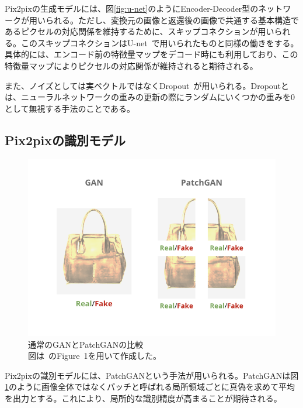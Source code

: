 Pix2pixの生成モデルには、図\ref{fig:u-net}のようにEncoder-Decoder型のネットワークが用いられる。ただし、変換元の画像と返還後の画像で共通する基本構造であるピクセルの対応関係を維持するために、スキップコネクションが用いられる。このスキップコネクションはU-net~\cite{u-net}で用いられたものと同様の働きをする。具体的には、エンコード前の特徴量マップをデコード時にも利用しており、この特徴量マップによりピクセルの対応関係が維持されると期待される。

また、ノイズとしては実ベクトルではなくDropout~\cite{Dropout}が用いられる。Dropoutとは、ニューラルネットワークの重みの更新の際にランダムにいくつかの重みを0として無視する手法のことである。

\subsection{Pix2pixの識別モデル}

\begin{figure}[b]
\begin{center}
\includegraphics[width=0.6\hsize]{figure/patchgan.png}
\caption{通常のGANとPatchGANの比較\\
図は~\cite{pix2pix}のFigure~1を用いて作成した。}
\label{fig:patchgan}
\end{center}
\end{figure}

Pix2pixの識別モデルには、PatchGANという手法が用いられる。PatchGANは図\ref{fig:patchgan}のように画像全体ではなくパッチと呼ばれる局所領域ごとに真偽を求めて平均を出力とする。これにより、局所的な識別精度が高まることが期待される。